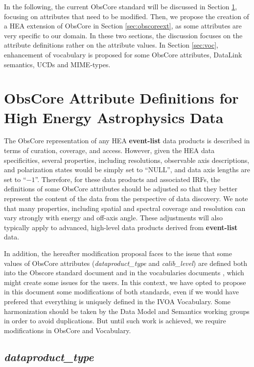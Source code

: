 \documentclass[11pt,a4paper]{ivoa}
\begin{document}
In the following, the current ObsCore standard will be discussed in Section \ref{sec:obscore}, focusing on attributes that need to be modified. Then, we propose the creation of a \gls{HEA} extension of ObsCore in Section \ref{sec:obscoreext}, as some attributes are very specific to our domain. In these two sections, the discussion focuses on the attribute definitions rather on the attribute values. In Section \ref{sec:voc}, enhancement of vocabulary is proposed for some ObsCore attributes, DataLink semantics, UCDs and MIME-types.

\section{ObsCore Attribute Definitions for High Energy Astrophysics Data}
\label{sec:obscore}

The ObsCore representation of any \gls{HEA} \textbf{event-list} data products is described in terms of curation, coverage, and access. However, given the \gls{HEA} data specificities, several properties, including resolutions, observable axis descriptions, and polarization states would be simply set to ``NULL'', and data axis lengths are set to ``$-1$''.  Therefore, for these data products and associated \glspl{IRF}, the definitions of some ObsCore attributes should be adjusted so that they better represent the content of the data from the perspective of data discovery. We note that many properties, including spatial and spectral coverage and resolution can vary strongly with energy and off-axis angle. These adjustments will also typically apply to advanced, high-level data products derived from \textbf{event-list} data.

In addition, the hereafter modification proposal faces to the issue that some values of ObsCore attributes ({\em dataproduct\_type} and {\em calib\_level}) are defined both into the Obscore standard document \citep{2017ivoa.spec.0509L} and in the vocabularies documents \citep{2023ivoa.spec.0206D, 2021ivoa.spec.0525D}, which might create some issues for the users. In this context, we have opted to propose  in this document some modifications of both standards, even if we would have prefered that everything is uniquely defined in the \gls{IVOA} Vocabulary. Some harmonization should be taken by the Data Model and Semantics working groups in order to avoid duplications. But until such work is achieved, we require modifications in ObsCore and Vocabulary.

\subsection{{\em dataproduct\_type}}
\label{sec:dataproduct_type}
\end{document}
